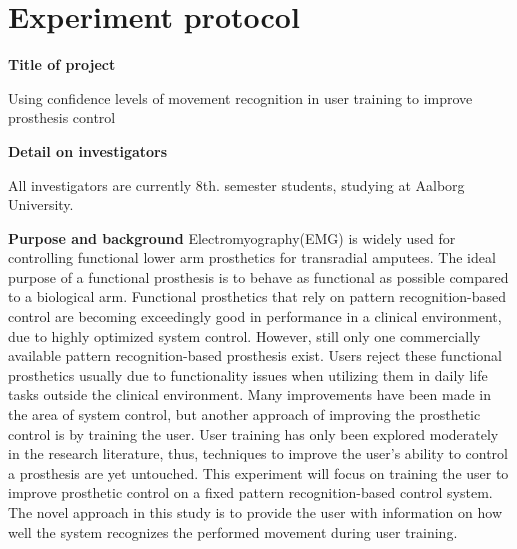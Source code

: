 \section{Experiment protocol}

\textbf{Title of project}

Using confidence levels of movement recognition in user training to improve prosthesis control 

\textbf{Detail on investigators}

All investigators are currently 8th. semester students, studying at Aalborg University.  

\textbf{Purpose and background}
Electromyography(EMG) is widely used for controlling functional lower arm prosthetics for transradial amputees. The ideal purpose of a functional prosthesis is to behave as functional as possible compared to a biological arm. Functional prosthetics that rely on pattern recognition-based control are becoming exceedingly good in performance in a clinical environment, due to highly optimized system control. However, still only one commercially available pattern recognition-based prosthesis exist. Users reject these functional prosthetics usually due to functionality issues when utilizing them in daily life tasks outside the clinical environment. Many improvements have been made in the area of system control, but another approach of improving the prosthetic control is by training the user. User training has only been explored moderately in the research literature, thus, techniques to improve the user's ability to control a prosthesis are yet untouched. This experiment will focus on training the user to improve prosthetic control on a fixed pattern recognition-based control system. The novel approach in this study is to provide the user with information on how well the system recognizes the performed movement during user training. 


